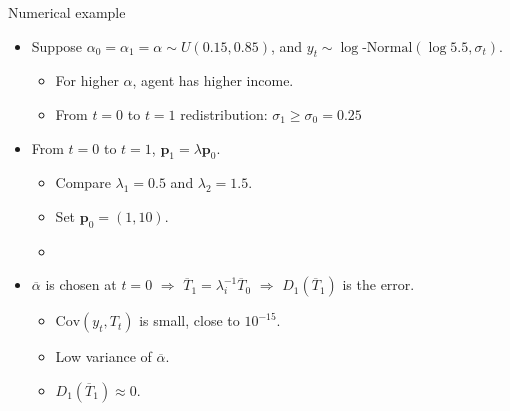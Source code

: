 \documentclass[10pt, handout]{beamer}
\begin{document}
\begin{frame}[label=Category-Example]{Numerical example}
	\vfill
	\begin{itemize}
		\item Suppose $\alpha_{0} = \alpha_{1} = \alpha \sim U(0.15,0.85)$, and $y_{t} \sim \log\text{-Normal}(\log 5.5, \sigma_{t})$.\vspace{1ex}
			\begin{itemize}
				\item For higher $\alpha$, agent has higher income. \hyperlink{Category-Support}{} \vspace{1ex}
				\item From $t = 0$ to $t = 1$ redistribution: $\sigma_{1} \geq \sigma_{0} = 0.25$
			\end{itemize}\vfill
		
		\item From $t = 0$ to $t = 1$, $\mathbf{p}_{1} = \lambda \mathbf{p}_{0}$. \vspace{1ex}
			\begin{itemize}
				\item Compare $\lambda_{1} = 0.5$ and $\lambda_{2} = 1.5$.\vspace{1ex}
				\item Set $\mathbf{p}_{0} = (1,10)$.\vspace{1ex}
				\item \hyperlink{Category-TbyP}{}
			\end{itemize} \vfill
		
		\item $\overline{\alpha}$ is chosen at $t = 0$ $\Rightarrow$ $\overline{T}_{1} = \lambda_{i}^{-1} \overline{T}_{0}$ $\Rightarrow$ $D_{1}(\overline{T}_{1})$ is the error.\vspace{1ex}
			\begin{itemize}
				\item $\mathrm{Cov}(y_{t}, T_{t})$ is small, close to $10^{-15}$.\vspace{1ex}
				\item Low variance of $\overline{\alpha}$. \hyperlink{Category-alphaBar}{} \vspace{1ex}
				\item $D_{1}(\overline{T}_{1}) \approx 0$. \hyperlink{Category-Dt}{}
			\end{itemize} \vfill

	\end{itemize}

\end{frame}
\end{document}
